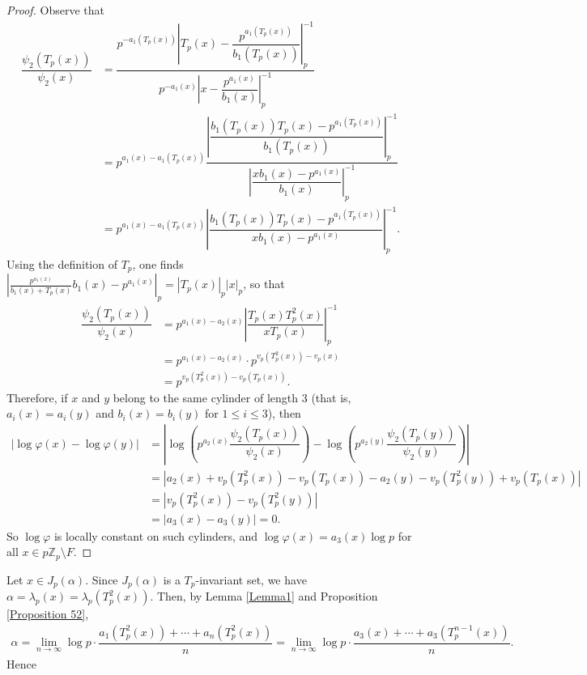 \documentclass[11pt]{amsart}
\theoremstyle{remark}
\numberwithin{equation}{section}
\newcommand{\Z}{\mathbb{Z}}
\begin{document}
\begin{proof}Observe that
    \begin{align*}
        \dfrac{\psi_{2}(T_p(x))}{\psi_{2}(x)} &=\dfrac{p^{-a_1\left(T_p(x)\right)}\left| T_p(x)-\dfrac{p^{a_1(T_p(x))}}{b_1(T_p(x))}\right|_p^{-1}}{p^{-a_1(x)}\left| x-\dfrac{p^{a_1(x)}}{b_1(x)} \right|_p^{-1}}\\
        &= p^{a_1(x)-a_1(T_p(x))} \dfrac{\left|\dfrac{b_1(T_p(x))T_p(x)-p^{a_1(T_p(x))}}{b_1(T_p(x))}\right|^{-1}_p}{\left|\dfrac{xb_1(x)-p^{a_1(x)}}{b_1(x)}\right|^{-1}_p}\\
        &=p^{a_1(x)-a_1(T_p(x))}\left|\dfrac{b_1(T_p(x))T_p(x)-p^{a_1(T_p(x))}}{xb_1(x)-p^{a_1(x)}} \right|_p^{-1}.
\end{align*} Using the definition of $T_{p}$, one finds $\left|\frac{p^{a_{1}(x)}}{b_{1}(x)+T_{p}(x)}b_{1}(x)-p^{a_{1}(x)}\right|_{p}=|T_{p}(x)|_{p}|x|_{p}$, so that
\begin{align*}
  \dfrac{\psi_{2}(T_p(x))}{\psi_{2}(x)}  &=p^{a_1(x)-a_2(x)} \left|\dfrac{T_p(x)T_p^2(x)}{xT_p(x)} \right|_p^{-1}\\
        &=p^{a_1(x)-a_2(x)}\cdot p^{v_p(T_p^2(x))-v_p(x)}\\
        &=p^{v_p(T_p^2(x))-v_p(T_p(x))}.
\end{align*}
Therefore, if $x$ and $y$ belong to the same cylinder of length 3 (that is, $a_{i}(x)=a_{i}(y)$ and $b_{i}(x)=b_{i}(y)$ for $1\leq i \leq 3$), then
    \begin{align*}
        \left|\log\varphi(x)-\log\varphi(y) \right|&=\left|\log\left(p^{a_2(x)}\dfrac{\psi_{2}(T_p(x))}{\psi_{2}(x)} \right) -\log\left(p^{a_2(y)}\dfrac{\psi_{2}(T_p(y))}{\psi_{2}(y)} \right)\right|\\
        &=|a_2(x)+v_p(T_p^2(x))-v_p(T_p(x))-a_2(y)-v_p(T_p^2(y))+v_p(T_p(x))|\\
        &=|v_p(T_p^2(x))-v_p(T_p^2(y))|\\
        &=|a_{3}(x)-a_{3}(y)|=0.
    \end{align*}
So $\log \varphi$ is locally constant on such cylinders, and $\log\varphi (x)=a_{3}(x)\log p$ for all $x\in p\Z_{p}\setminus F$. 
\end{proof}
Let $x\in J_{p}(\alpha)$. Since $J_{p}(\alpha)$ is a $T_{p}$-invariant set, we have $\alpha=\lambda_{p}(x)=\lambda_{p}(T_{p}^{2}(x))$. Then, by Lemma \ref{Lemma1} and Proposition \ref{Proposition 52}, 
\begin{align*}
    \alpha =\lim_{n\to \infty}\log p\cdot \dfrac{a_{1}(T_{p}^{2}(x))+\cdots+a_{n}(T_{p}^{2}(x))}{n}=\lim_{n\to \infty}\log p\cdot \dfrac{a_{3}(x)+\cdots+a_{3}(T_{p}^{n-1}(x))}{n}.
\end{align*} Hence
\end{document}
